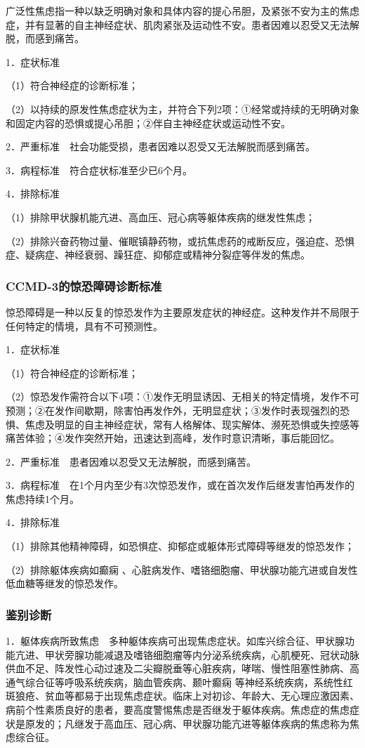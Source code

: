 广泛性焦虑指一种以缺乏明确对象和具体内容的提心吊胆，及紧张不安为主的焦虑症，并有显著的自主神经症状、肌肉紧张及运动性不安。患者因难以忍受又无法解脱，而感到痛苦。

1．症状标准

（1）符合神经症的诊断标准；

（2）以持续的原发性焦虑症状为主，并符合下列2项：①经常或持续的无明确对象和固定内容的恐惧或提心吊胆；②伴自主神经症状或运动性不安。

2．严重标准　社会功能受损，患者因难以忍受又无法解脱而感到痛苦。

3．病程标准　符合症状标准至少已6个月。

4．排除标准

（1）排除甲状腺机能亢进、高血压、冠心病等躯体疾病的继发性焦虑；

（2）排除兴奋药物过量、催眠镇静药物，或抗焦虑药的戒断反应，强迫症、恐惧症、疑病症、神经衰弱、躁狂症、抑郁症或精神分裂症等伴发的焦虑。

\subsubsection{CCMD-3的惊恐障碍诊断标准}

惊恐障碍是一种以反复的惊恐发作为主要原发症状的神经症。这种发作并不局限于任何特定的情境，具有不可预测性。

1．症状标准

（1）符合神经症的诊断标准；

（2）惊恐发作需符合以下4项：①发作无明显诱因、无相关的特定情境，发作不可预测；②在发作间歇期，除害怕再发作外，无明显症状；③发作时表现强烈的恐惧、焦虑及明显的自主神经症状，常有人格解体、现实解体、濒死恐惧或失控感等痛苦体验；④发作突然开始，迅速达到高峰，发作时意识清晰，事后能回忆。

2．严重标准　患者因难以忍受又无法解脱，而感到痛苦。

3．病程标准　在1个月内至少有3次惊恐发作，或在首次发作后继发害怕再发作的焦虑持续1个月。

4．排除标准

（1）排除其他精神障碍，如恐惧症、抑郁症或躯体形式障碍等继发的惊恐发作；

（2）排除躯体疾病如癫痫
、心脏病发作、嗜铬细胞瘤、甲状腺功能亢进或自发性低血糖等继发的惊恐发作。

\subsubsection{鉴别诊断}

1．躯体疾病所致焦虑　多种躯体疾病可出现焦虑症状。如库兴综合征、甲状腺功能亢进、甲状旁腺功能减退及嗜铬细胞瘤等内分泌系统疾病，心肌梗死、冠状动脉供血不足、阵发性心动过速及二尖瓣脱垂等心脏疾病，哮喘、慢性阻塞性肺病、高通气综合征等呼吸系统疾病，脑血管疾病、颞叶癫痫
等神经系统疾病，系统性红斑狼疮、贫血等都易于出现焦虑症状。临床上对初诊、年龄大、无心理应激因素、病前个性素质良好的患者，要高度警惕焦虑是否继发于躯体疾病。焦虑症的焦虑症状是原发的；凡继发于高血压、冠心病、甲状腺功能亢进等躯体疾病的焦虑称为焦虑综合征。

